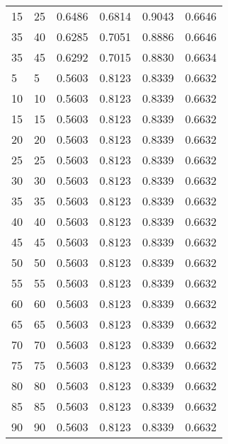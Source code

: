 \begin{center}
\begin{longtable}{|l|l|l|l|l|l|}
15                & 25                & 0.6486    & 0.6814 & 0.9043      & 0.6646    \\
35                & 40                & 0.6285    & 0.7051 & 0.8886      & 0.6646    \\
35                & 45                & 0.6292    & 0.7015 & 0.8830      & 0.6634    \\
5                 & 5                 & 0.5603    & 0.8123 & 0.8339      & 0.6632    \\
10                & 10                & 0.5603    & 0.8123 & 0.8339      & 0.6632    \\
15                & 15                & 0.5603    & 0.8123 & 0.8339      & 0.6632    \\
20                & 20                & 0.5603    & 0.8123 & 0.8339      & 0.6632    \\
25                & 25                & 0.5603    & 0.8123 & 0.8339      & 0.6632    \\
30                & 30                & 0.5603    & 0.8123 & 0.8339      & 0.6632    \\
35                & 35                & 0.5603    & 0.8123 & 0.8339      & 0.6632    \\
40                & 40                & 0.5603    & 0.8123 & 0.8339      & 0.6632    \\
45                & 45                & 0.5603    & 0.8123 & 0.8339      & 0.6632    \\
50                & 50                & 0.5603    & 0.8123 & 0.8339      & 0.6632    \\
55                & 55                & 0.5603    & 0.8123 & 0.8339      & 0.6632    \\
60                & 60                & 0.5603    & 0.8123 & 0.8339      & 0.6632    \\
65                & 65                & 0.5603    & 0.8123 & 0.8339      & 0.6632    \\
70                & 70                & 0.5603    & 0.8123 & 0.8339      & 0.6632    \\
75                & 75                & 0.5603    & 0.8123 & 0.8339      & 0.6632    \\
80                & 80                & 0.5603    & 0.8123 & 0.8339      & 0.6632    \\
85                & 85                & 0.5603    & 0.8123 & 0.8339      & 0.6632    \\
90                & 90                & 0.5603    & 0.8123 & 0.8339      & 0.6632    \\

\end{longtable}
\end{center}
